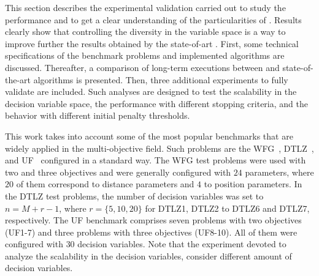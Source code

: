 This section describes the experimental validation carried out to study the performance and
to get a clear understanding of the particularities of \VSDMOEA{}.
%
Results clearly show that controlling the diversity in the variable space is a way to improve further the results 
obtained by the state-of-art \MOEAS{}.
%
First, some technical specifications of the benchmark problems and implemented algorithms are discussed.
%
Thereafter, a comparison of long-term executions between \VSDMOEA{} and state-of-the-art algorithms is presented.
%
Then, three additional experiments to fully validate \VSDMOEA{} are included.
%
Such analyses are designed to test the scalability in the decision variable space, the performance with different stopping criteria, 
and the behavior with different initial penalty thresholds.

This work takes into account some of the most popular benchmarks that are widely applied in the multi-objective field.
%
Such problems are the WFG~\cite{Joel:WFG}, DTLZ~\cite{Joel:DTLZ}, and UF~\cite{Joel:CEC2009} configured in a 
standard way.
%
The WFG test problems were used with two and three objectives and 
were generally configured with $24$ parameters, where $20$ of them correspond to distance parameters and $4$ to position parameters.
%
In the DTLZ test problems, the number of decision variables was set to $n=M+r-1$, where $r=\{5, 10, 20\}$ for DTLZ1, DTLZ2 to DTLZ6 and DTLZ7, respectively.
% 
The UF benchmark comprises seven problems with two objectives (UF1-7) and three problems with three objectives (UF8-10).
%
All of them were configured with $30$ decision variables.
%
Note that the experiment devoted to analyze the scalability in the decision variables, consider different amount
of decision variables.

